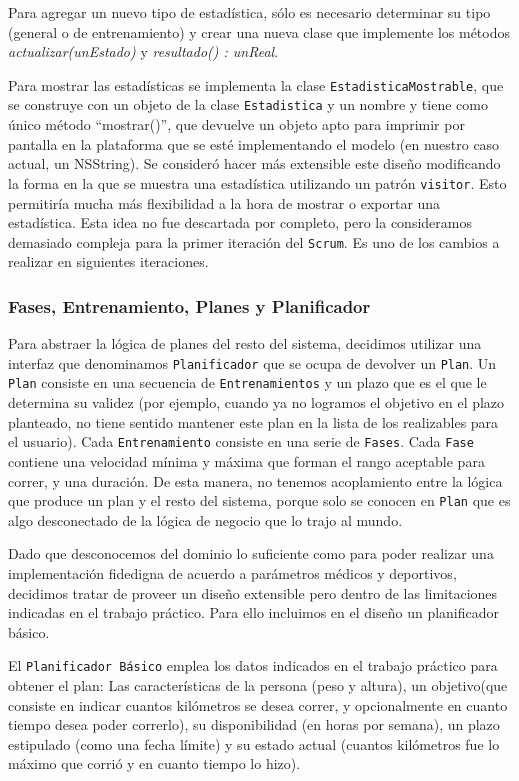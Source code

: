 \documentclass[10pt, a4paper,english,spanish]{article}
\begin{document}
Para agregar un nuevo tipo de estadística, sólo es necesario determinar su tipo (general o de entrenamiento) y crear una nueva clase que implemente los métodos \emph{actualizar(unEstado)} y \emph{resultado() : unReal}.

Para mostrar las estadísticas se implementa la clase \texttt{EstadisticaMostrable}, que se construye con un objeto de la clase \texttt{Estadistica} y un nombre y tiene como único método ``mostrar()'', que devuelve un objeto apto para imprimir por pantalla en la plataforma que se esté implementando el modelo (en nuestro caso actual, un NSString). Se consideró hacer más extensible este diseño modificando la forma en la que se muestra una estadística utilizando un patrón \texttt{visitor}. Esto permitiría mucha más flexibilidad a la hora de mostrar o exportar una estadística. Esta idea no fue descartada por completo, pero la consideramos demasiado compleja para la primer iteración del \texttt{Scrum}. Es uno de los cambios a realizar en siguientes iteraciones.

\subsubsection{Fases, Entrenamiento, Planes y Planificador}
Para abstraer la lógica de planes del resto del sistema, decidimos utilizar una interfaz que denominamos \texttt{Planificador} que se ocupa de devolver un
\texttt{Plan}. Un \texttt{Plan} consiste en una secuencia de \texttt{Entrenamientos} y un plazo que es el que le determina su validez (por ejemplo, cuando ya no logramos el objetivo en el plazo planteado, no tiene sentido mantener este plan en la lista de los realizables para el usuario). Cada \texttt{Entrenamiento} consiste en una serie de \texttt{Fases}. Cada \texttt{Fase} contiene una velocidad mínima y máxima que forman el rango aceptable para correr, y una duración. De esta manera, no tenemos acoplamiento entre la lógica que produce un plan y el resto del sistema, porque solo se conocen en \texttt{Plan} que es algo desconectado de la lógica de negocio que lo trajo al mundo.

Dado que desconocemos del dominio lo suficiente como para poder realizar una implementación fidedigna de acuerdo a parámetros médicos y deportivos, decidimos tratar de proveer un dise\~no extensible pero dentro de las limitaciones indicadas en el trabajo práctico. Para ello incluimos en el dise\~no un planificador básico.

El \texttt{Planificador Básico} emplea los datos indicados en el trabajo práctico para obtener el plan: Las características de la persona (peso y altura), un objetivo(que consiste en indicar cuantos kilómetros se desea correr, y opcionalmente en cuanto tiempo desea poder correrlo), su disponibilidad (en horas por semana), un plazo estipulado (como una fecha límite) y su estado actual (cuantos kilómetros fue lo máximo que corrió y en cuanto tiempo lo hizo).
\end{document}
